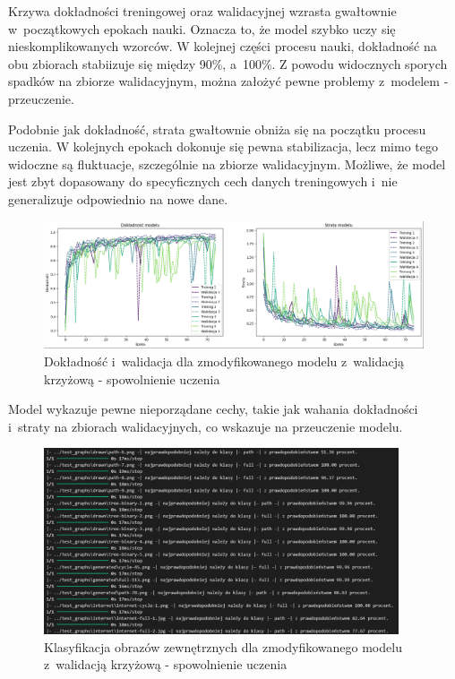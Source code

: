 Krzywa dokładności treningowej oraz walidacyjnej wzrasta gwałtownie w~początkowych epokach nauki.
Oznacza to, że model szybko uczy się nieskomplikowanych wzorców.
W kolejnej części procesu nauki, dokładność na obu zbiorach stabiizuje się między 90\%, a~100\%.
Z powodu widocznych sporych spadków na zbiorze walidacyjnym, można założyć pewne problemy z~modelem - przeuczenie.

Podobnie jak dokładność, strata gwałtownie obniża się na początku procesu uczenia.
W kolejnych epokach dokonuje się pewna stabilizacja, lecz mimo tego widoczne są fluktuacje, szczególnie na zbiorze walidacyjnym.
Możliwe, że model jest zbyt dopasowany do specyficznych cech danych treningowych i~nie generalizuje odpowiednio na nowe dane.

\begin{figure}[ht]
	\centering
	\includegraphics[width=15.5cm]{resources/tests/images/v4/crossvalid_4_img.png}
	\caption{Dokładność i~walidacja dla zmodyfikowanego modelu z~walidacją krzyżową - spowolnienie uczenia}
	\label{Fig:tests-cv-4a}
\end{figure}
\FloatBarrier

Model wykazuje pewne nieporządane cechy, takie jak wahania dokładności i~straty na zbiorach walidacyjnych,
co wskazuje na przeuczenie modelu.

\begin{figure}[ht]
	\centering
	\includegraphics[height=5.5cm]{resources/tests/images/v4/crossvalid_4_txt.png}
	\caption{Klasyfikacja obrazów zewnętrznych dla zmodyfikowanego modelu z~walidacją krzyżową - spowolnienie uczenia}
	\label{Fig:tests-cv-4b}
\end{figure}
\FloatBarrier

